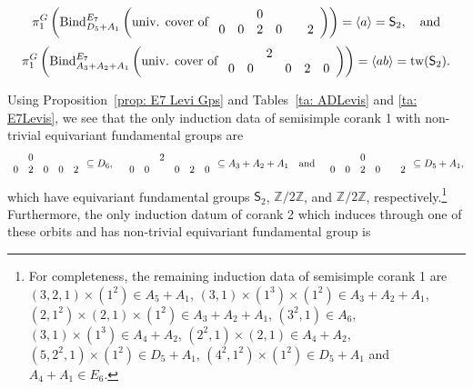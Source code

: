 \documentclass[11pt]{amsart}
\newcommand{\bZ}{{\mathbb Z}}
\newcommand{\Sym}{{\mathsf{S}}}
\newcommand{\tw}{{{\mbox{\rm tw}}}}
\newcommand{\BInd}{{{\mbox{\rm Bind}}}}
\numberwithin{equation}{section}
\begin{document}
	$$
	\pi_1^G\left(\BInd_{D_5 + A_1}^{E_7}\left(\mbox{univ. cover of }\begin{array}{c c c c c c}
	& & 0 & & &\\
	0 & 0 & 2 & 0 & & 2   \\
	\end{array} \right)\right)=\langle a\rangle=\Sym_2,\quad \mbox{and}$$ 
	$$
	\pi_1^G\left(\BInd_{A_3+A_2+ A_1}^{E_7}\left(\mbox{univ. cover of }\begin{array}{c c c c c c c}
	& & 2 & & &\\
	0 & 0 &  & 0 & 2 & 0   \\
	\end{array} \right)\right)=\langle ab\rangle=\tw(\Sym_2).$$ 
	
	\iffalse
	
	Using Proposition~\ref{prop: E7 Levi Gps} and Tables~\ref{ta: ADLevis} and \ref{ta: E7Levis}, we see that the only induction data of semisimple corank 1 with non-trivial equivariant fundamental groups are 
	$$\begin{array}{c c c c c c}
		& 0 & & & \\
		0 & 2 & 0 & 0 & 2 \\
	\end{array}\subseteq D_6,\quad \begin{array}{c c c c c c c}
	& & 2 & & &\\
	0 & 0 &  & 0 & 2 & 0   \\
	\end{array} \subseteq A_3+A_2 + A_1 \quad \mbox{and}\quad \begin{array}{c c c c c c c}
		& & 0 & & &\\
		0 & 0 & 2 & 0 & & 2   \\
	\end{array} \subseteq D_5 + A_1,$$ which have equivariant fundamental groups $\Sym_2$, $\bZ/2\bZ$, and $\bZ/2\bZ$, respectively.\footnote{For completeness, the remaining induction data of semisimple corank 1 are $(3,2,1)\times(1^2)\in A_5+A_1$, $(3,1)\times(1^3)\times(1^2)\in A_3+A_2+A_1$, $(2,1^2)\times (2,1)\times (1^2)\in A_3+A_2+A_1$, $(3^2,1)\in A_6$, $(3,1)\times (1^3)\in A_4+A_2$, $(2^2,1)\times (2,1)\in A_4+A_2$, $(5,2^2,1)\times (1^2)\in D_5+A_1$, $(4^2,1^2)\times (1^2)\in D_5+A_1$ and $A_4+A_1\in E_6$.} Furthermore, the only induction datum of corank 2 which induces through one of these orbits and has non-trivial equivariant fundamental group is
\end{document}

